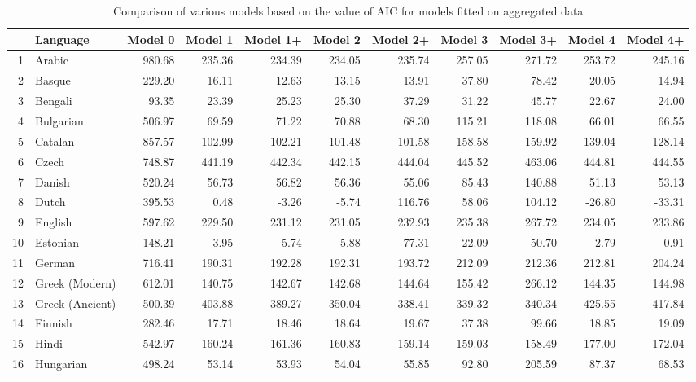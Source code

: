\documentclass[a4paper]{article}
\begin{document}
\pagestyle{empty}
\begin{table}
	\caption{Comparison of various models based on the value of AIC  for models fitted on aggregated data} \label{table:NSFAccuDivBG}%
	\centering
	\begin{tabular}{rlrrrrrrrrr}
		\hline
		& Language & Model 0 & Model 1 & Model 1+ & Model 2 & Model 2+ & Model 3 & Model 3+ & Model 4 & Model 4+ \\ 
		\hline
		1 & Arabic & 980.68 & 235.36 & 234.39 & 234.05 & 235.74 & 257.05 & 271.72 & 253.72 & 245.16 \\ 
		2 & Basque & 229.20 & 16.11 & 12.63 & 13.15 & 13.91 & 37.80 & 78.42 & 20.05 & 14.94 \\ 
		3 & Bengali & 93.35 & 23.39 & 25.23 & 25.30 & 37.29 & 31.22 & 45.77 & 22.67 & 24.00 \\ 
		4 & Bulgarian & 506.97 & 69.59 & 71.22 & 70.88 & 68.30 & 115.21 & 118.08 & 66.01 & 66.55 \\ 
		5 & Catalan & 857.57 & 102.99 & 102.21 & 101.48 & 101.58 & 158.58 & 159.92 & 139.04 & 128.14 \\ 
		6 & Czech & 748.87 & 441.19 & 442.34 & 442.15 & 444.04 & 445.52 & 463.06 & 444.81 & 444.55 \\ 
		7 & Danish & 520.24 & 56.73 & 56.82 & 56.36 & 55.06 & 85.43 & 140.88 & 51.13 & 53.13 \\ 
		8 & Dutch & 395.53 & 0.48 & -3.26 & -5.74 & 116.76 & 58.06 & 104.12 & -26.80 & -33.31 \\ 
		9 & English & 597.62 & 229.50 & 231.12 & 231.05 & 232.93 & 235.38 & 267.72 & 234.05 & 233.86 \\ 
		10 & Estonian & 148.21 & 3.95 & 5.74 & 5.88 & 77.31 & 22.09 & 50.70 & -2.79 & -0.91 \\ 
		11 & German & 716.41 & 190.31 & 192.28 & 192.31 & 193.72 & 212.09 & 212.36 & 212.81 & 204.24 \\ 
		12 & Greek (Modern) & 612.01 & 140.75 & 142.67 & 142.68 & 144.64 & 155.42 & 266.12 & 144.35 & 144.98 \\ 
		13 & Greek (Ancient) & 500.39 & 403.88 & 389.27 & 350.04 & 338.41 & 339.32 & 340.34 & 425.55 & 417.84 \\ 
		14 & Finnish & 282.46 & 17.71 & 18.46 & 18.64 & 19.67 & 37.38 & 99.66 & 18.85 & 19.09 \\ 
		15 & Hindi & 542.97 & 160.24 & 161.36 & 160.83 & 159.14 & 159.03 & 158.49 & 177.00 & 172.04 \\ 
		16 & Hungarian & 498.24 & 53.14 & 53.93 & 54.04 & 55.85 & 92.80 & 205.59 & 87.37 & 68.53 \\ 

\end{tabular}
\end{table}
\end{document}
